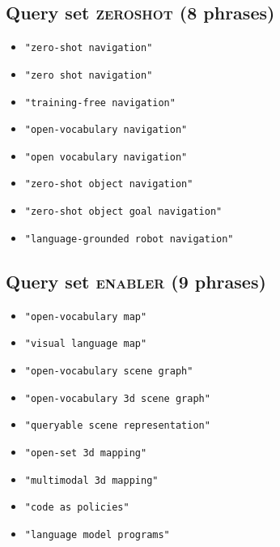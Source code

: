 \subsection*{Query set \textsc{zeroshot} (8 phrases)}
\begin{itemize}\setlength\itemsep{0pt}
  \item \texttt{"zero-shot navigation"}
  \item \texttt{"zero shot navigation"}
  \item \texttt{"training-free navigation"}
  \item \texttt{"open-vocabulary navigation"}
  \item \texttt{"open vocabulary navigation"}
  \item \texttt{"zero-shot object navigation"}
  \item \texttt{"zero-shot object goal navigation"}
  \item \texttt{"language-grounded robot navigation"}
\end{itemize}

\subsection*{Query set \textsc{enabler} (9 phrases)}
\begin{itemize}\setlength\itemsep{0pt}
  \item \texttt{"open-vocabulary map"}
  \item \texttt{"visual language map"}
  \item \texttt{"open-vocabulary scene graph"}
  \item \texttt{"open-vocabulary 3d scene graph"}
  \item \texttt{"queryable scene representation"}
  \item \texttt{"open-set 3d mapping"}
  \item \texttt{"multimodal 3d mapping"}
  \item \texttt{"code as policies"}
  \item \texttt{"language model programs"}
\end{itemize}
